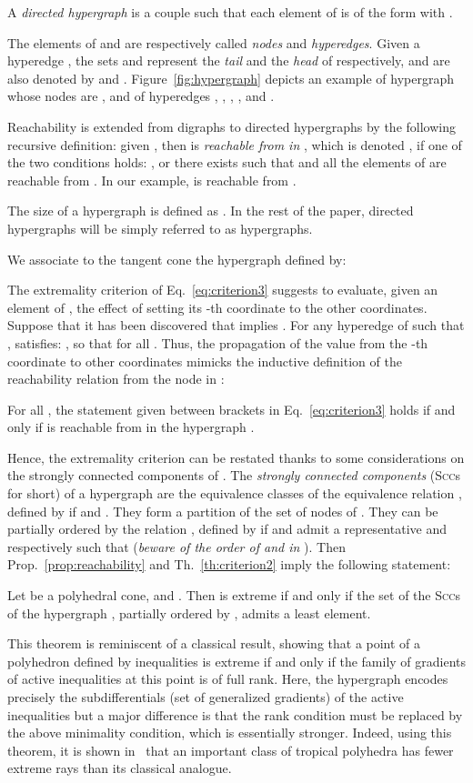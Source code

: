 \documentclass[proceedings]{stacs}
\newcommand{\scc}{\textsc{Scc}}
\begin{document}
A \emph{directed hypergraph} is a couple  such that each element of  is of the form  with . 

The elements of  and  are respectively called \emph{nodes} and \emph{hyperedges}. Given a hyperedge , the sets  and  represent the \emph{tail} and the \emph{head} of  respectively, and are also denoted by  and . Figure~\ref{fig:hypergraph} depicts an example of hypergraph whose nodes are , and of hyperedges , , , , and .

Reachability is extended from digraphs to directed hypergraphs by the following recursive definition: given , then  is \emph{reachable from  in }, which is denoted , if one of the two conditions holds:
, 
or there exists  such that  and all the elements of  are reachable from .
In our example,  is reachable from .

The size  of a hypergraph  is defined as . In the rest of the paper, directed hypergraphs will be simply referred to as hypergraphs.

We associate to the tangent cone  the hypergraph  defined by:

The extremality criterion of Eq.~\eqref{eq:criterion3} suggests to evaluate, given an element of , the effect of setting its -th coordinate to the other coordinates. Suppose that it has been discovered that  implies . For any hyperedge  of  such that ,  satisfies:
,
so that  for all . Thus, the propagation of the value  from the -th coordinate to other coordinates mimicks the inductive definition of the reachability relation from the node  in :
\begin{proposition}\label{prop:reachability}
For all , the statement given between brackets in Eq.~\eqref{eq:criterion3} holds if and only if  is reachable from  in the hypergraph .
\end{proposition}
Hence, the extremality criterion can be restated thanks to some considerations on the strongly connected components of . The \emph{strongly connected components} (\scc{}s for short) of a hypergraph  are the equivalence classes of the equivalence relation , defined by  if  and . They form a partition of the set of nodes of . They can be partially ordered by the relation , defined by  if  and  admit a representative  and  respectively such that  (\emph{beware of the order of  and  in }). Then Prop.~\ref{prop:reachability} and Th.~\ref{th:criterion2} imply the following statement:
\begin{theorem}\label{th:minimality}
Let  be a polyhedral cone, and . Then  is extreme if and only if the set of the \scc{}s of the hypergraph , partially ordered by , admits a least element. 
\end{theorem}
This theorem is reminiscent of a classical result,
showing that a point of a polyhedron defined by inequalities
is extreme if and only if the family of gradients of active inequalities
at this point is of full rank. Here, the hypergraph encodes precisely the
subdifferentials (set of generalized gradients) of the active inequalities
but a major difference is that the rank
condition must be replaced by the above minimality condition, which is
essentially stronger. Indeed, using this theorem, it is shown in~\cite{AGK09} that an important class of tropical polyhedra has fewer extreme rays than its classical analogue. 
\end{document}
